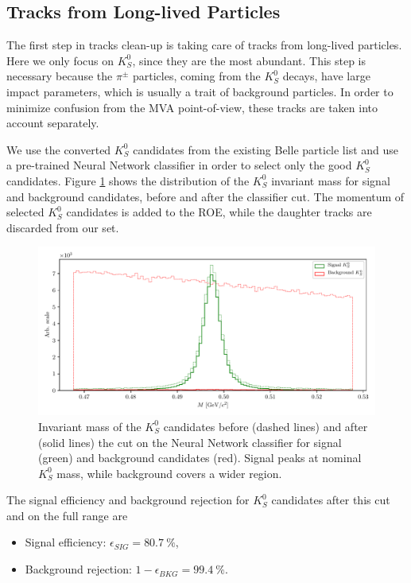 \subsection{Tracks from Long-lived Particles}

The first step in tracks clean-up is taking care of tracks from long-lived particles. Here we only focus on $K_S^0$, since they are the most abundant. This step is necessary because the $\pi^\pm$ particles, coming from the $K_S^0$ decays, have large impact parameters, which is usually a trait of background particles. In order to minimize confusion from the MVA point-of-view, these tracks are taken into account separately.

We use the converted $K_S^0$ candidates from the existing Belle particle list and use a pre-trained Neural Network classifier in order to select only the good $K_S^0$ candidates. Figure \ref{fig:ROE_V0} shows the distribution of the $K_S^0$ invariant mass for signal and background candidates, before and after the classifier cut. The momentum of selected $K_S^0$ candidates is added to the ROE, while the daughter tracks are discarded from our set.

\begin{figure}[!htb]
	\centering
	\captionsetup{width=0.8\linewidth}
	\includegraphics[width=\linewidth]{fig/ROECleanup_V0}
	\caption{Invariant mass of the $K_S^0$ candidates before (dashed lines) and after (solid lines) the cut on the Neural Network classifier for signal (green) and background candidates (red). Signal peaks at nominal $K_S^0$ mass, while background covers a wider region.}
	\label{fig:ROE_V0}
\end{figure}

The signal efficiency and background rejection for $K_S^0$ candidates after this cut and on the full range are
\begin{itemize}
	\item Signal efficiency: $\epsilon_{SIG} = 80.7~\%$,
	\item Background rejection: $1-\epsilon_{BKG} = 99.4~\%$.
\end{itemize}

